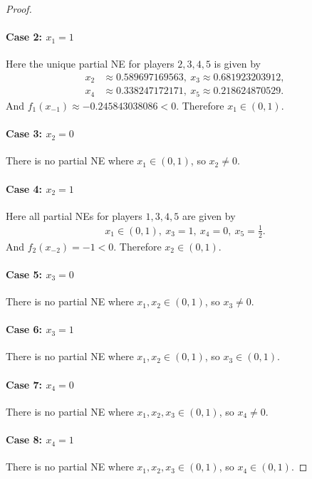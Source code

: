 \documentclass[preprint,12pt,authoryear]{elsarticle}
\begin{document}
\begin{proof}
  \paragraph{Case 2: $x_1=1$} Here the unique partial NE for players $2,3,4,5$ is given by
  \begin{align*}
    x_2&\approx0.589697169563,~x_3\approx0.681923203912,\\
    x_4&\approx0.338247172171,~x_5\approx0.218624870529.
  \end{align*}
  And $f_1(x_{-1})\approx-0.245843038086<0$. Therefore $x_1\in(0,1)$.

  \paragraph{Case 3: $x_2=0$} There is no partial NE where $x_1\in(0,1)$, so $x_2\ne0$.

  \paragraph{Case 4: $x_2=1$} Here all partial NEs for players $1,3,4,5$ are given by
  \begin{align*}
    x_1\in(0,1),~x_3=1,~x_4=0,~x_5=\frac{1}{2}.
  \end{align*}
  And $f_2(x_{-2})=-1<0$. Therefore $x_2\in(0,1)$.

  \paragraph{Case 5: $x_3=0$} There is no partial NE where $x_1,x_2\in(0,1)$, so 
  $x_3\ne0$.

  \paragraph{Case 6: $x_3=1$} There is no partial NE where $x_1,x_2\in(0,1)$, so 
  $x_3\in(0,1)$.

  \paragraph{Case 7: $x_4=0$} There is no partial NE where $x_1,x_2,x_3\in(0,1)$, so 
  $x_4\ne0$.

  \paragraph{Case 8: $x_4=1$} There is no partial NE where $x_1,x_2,x_3\in(0,1)$, so 
  $x_4\in(0,1)$.


\end{proof}
\end{document}
